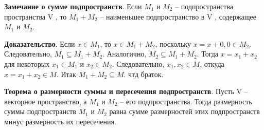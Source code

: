 \documentclass[a4paper]{article}
\begin{document}
    \begin{htheorem}
        \textbf{Замечание о сумме подпространств}. Если $M_1$ и $M_2$ – подпространства пространства V , то $M_1 + M_2$ –
        наименьшее подпространство в V , содержащее $M_1$ и $M_2$.
    \end{htheorem}


    \begin{hproof}
        \textbf{Доказательство}. Если $x \in M_1$, то $x \in M_1 + M_2$, поскольку $x = x + 0, 0 \in M_2$. Следовательно, $M_1 \subseteq M_1 + M_2$. Аналогично, $M_2 \subseteq M_1 + M_2$. Тогда $x = x_1 + x_2$ для некоторых $x_1 \in M_1$ и $x_2 \in M_2$. Следовательно, $x_1, x_2 \in M$, откуда $x=x_1+x_2 \in M$. Итак $M_1 + M_2 \subseteq M$. чтд браток.
    \end{hproof}


    \newpage \begin{center}
                 \begin{Large}

                 \end{Large}
    \end{center}
    \begin{htheorem}
        \textbf{Теорема о размерности суммы и пересечения подпространств}. Пусть V – векторное пространство, а $M_1$ и $M_2$ – его подпространства.
        Тогда размерность суммы подпространств $M_1$ и $M_2$ равна сумме размерностей этих подпространств минус размерность их пересечения.
    \end{htheorem}
\end{document}
